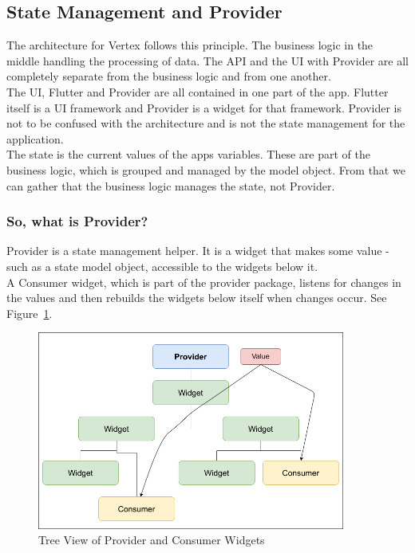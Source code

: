 \subsection{State Management and Provider}
The architecture for Vertex follows this principle. The business logic in the middle handling the processing of data. The API and the UI with Provider are all completely separate from the business logic and from one another.
\\ The UI, Flutter and Provider are all contained in one part of the app. Flutter itself is a UI framework and Provider is a widget for that framework. Provider is not to be confused with the architecture and is not the state management for the application.
\\ The state is the current values of the apps variables. These are part of the business logic, which is grouped and managed by the model object. From that we can gather that the business logic manages the state, not Provider.

\subsubsection{So, what is Provider?}
Provider is a state management helper. It is a widget that makes some value - such as a state model object, accessible to the widgets below it.
\\ A Consumer widget, which is part of the provider package\cite{provider}, listens for changes in the values and then rebuilds the widgets below itself when changes occur.
See Figure~\ref{image:providerTree}.

\begin{figure}[h!]
    \caption{Tree View of Provider and Consumer Widgets}
    \label{image:providerTree}
    \centering
    \includegraphics[width=0.9\textwidth]{images/consumer_tree_with_value.png}
\end{figure}

